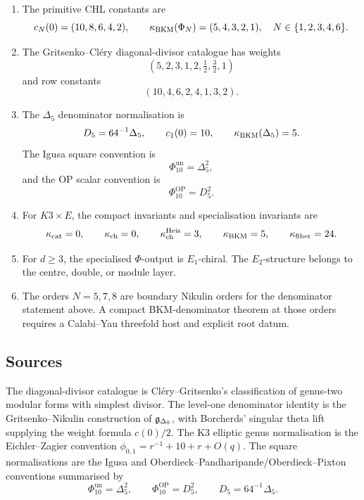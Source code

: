 \begin{enumerate}
\item The primitive CHL constants are
\[
        c_N(0)=(10,8,6,4,2),\qquad
        \kappa_{\mathrm{BKM}}(\Phi_N)=(5,4,3,2,1),
        \quad N\in\{1,2,3,4,6\}.
\]
\item The Gritsenko--Cl\'ery diagonal-divisor catalogue has weights
\[
        (5,2,3,1,2,\tfrac12,\tfrac32,1)
\]
and row constants
\[
        (10,4,6,2,4,1,3,2).
\]
\item The \(\Delta_5\) denominator normalisation is
\[
        D_5=64^{-1}\Delta_5,\qquad c_1(0)=10,\qquad
        \kappa_{\mathrm{BKM}}(\Delta_5)=5.
\]
The Igusa square convention is
\[
        \Phi_{10}^{\mathrm{un}}=\Delta_5^2,
\]
and the OP scalar convention is
\[
        \Phi_{10}^{\mathrm{OP}}=D_5^2.
\]
\item For \(K3\times E\), the compact invariants and specialisation
invariants are
\[
        \kappa_{\mathrm{cat}}=0,\qquad \kappa_{\mathrm{ch}}=0,\qquad
        \kappa_{\mathrm{ch}}^{\mathrm{Heis}}=3,\qquad \kappa_{\mathrm{BKM}}=5,\qquad \kappa_{\mathrm{fiber}}=24.
\]
\item For \(d\geq3\), the specialised \(\Phi\)-output is \(E_1\)-chiral.
The \(E_2\)-structure belongs to the centre, double, or module layer.
\item The orders \(N=5,7,8\) are boundary Nikulin orders for the
denominator statement above.  A compact BKM-denominator theorem at
those orders requires a Calabi--Yau threefold host and explicit root
datum.
\end{enumerate}

\subsection*{Sources}
\label{sec:frontier-sources}

The diagonal-divisor catalogue is Cl\'ery--Gritsenko's classification of
genus-two modular forms with simplest divisor.  The level-one
denominator identity is the Gritsenko--Nikulin construction of
\(\mathfrak{g}_{\Delta_5}\), with Borcherds' singular theta lift supplying the
weight formula \(c(0)/2\).  The K3 elliptic genus normalisation is the
Eichler--Zagier convention
\(\phi_{0,1}=r^{-1}+10+r+O(q)\).  The square normalisations are the
Igusa and Oberdieck--Pandharipande/Oberdieck--Pixton conventions
summarised by
\[
        \Phi_{10}^{\mathrm{un}}=\Delta_5^2,\qquad
        \Phi_{10}^{\mathrm{OP}}=D_5^2,\qquad
        D_5=64^{-1}\Delta_5 .
\]
